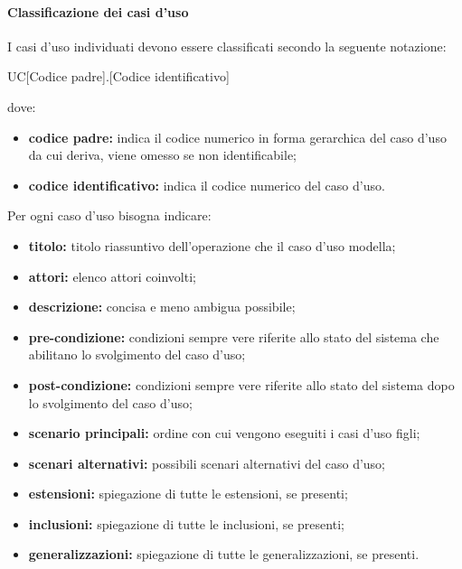             \paragraph{Classificazione dei casi d'uso}
            I casi d'uso individuati devono essere classificati secondo la seguente notazione:
            \begin{center}
            UC[Codice padre].[Codice identificativo]
            \end{center}
            dove:
            \begin{itemize}
                \item \textbf{codice padre:} indica il codice numerico in forma gerarchica del caso d'uso da cui deriva, viene omesso se non identificabile;
                \item \textbf{codice identificativo:} indica il codice numerico del caso d'uso.
            \end{itemize}
            Per ogni caso d'uso bisogna indicare:
            \begin{itemize}
                \item \textbf{titolo:} titolo riassuntivo dell'operazione che il caso d'uso modella;
                \item \textbf{attori:} elenco attori coinvolti;
                \item \textbf{descrizione:} concisa e meno ambigua possibile;
                \item \textbf{pre-condizione:} condizioni sempre vere riferite allo stato del sistema che abilitano lo svolgimento del caso d'uso;
                \item \textbf{post-condizione:} condizioni sempre vere riferite allo stato del sistema dopo lo svolgimento del caso d'uso;
                \item \textbf{scenario principali:} ordine con cui vengono eseguiti i casi d'uso figli;
                \item \textbf{scenari alternativi:} possibili scenari alternativi del caso d'uso;
                \item \textbf{estensioni:} spiegazione di tutte le estensioni, se presenti;
                \item \textbf{inclusioni:} spiegazione di tutte le inclusioni, se presenti;
                \item \textbf{generalizzazioni:} spiegazione di tutte le generalizzazioni, se presenti.
            \end{itemize}

